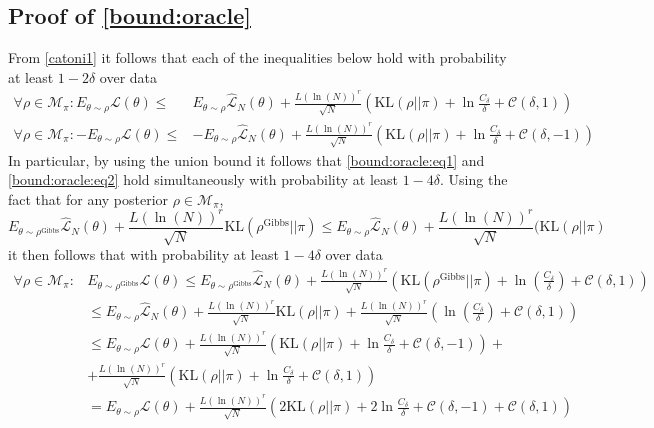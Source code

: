 \documentclass{article}
\newcommand{\KL}{\mathrm{KL}}
\renewcommand{\KL}{\mathrm{KL}}
\begin{document}
\subsection{Proof of \eqref{bound:oracle}}
  From \eqref{catoni1} it follows that  each of the inequalities below hold with probability at least $1-2\delta$
  over data
  \begin{align}
      \forall \rho \in \mathcal{M}_\pi: E_{\theta \sim \rho} \mathcal{L}(\theta) \leq & E_{\theta\sim \rho} \hat{\mathcal{L}}_N(\theta)+  \frac{L(\ln(N))^{r}}{\sqrt{N}}(\KL(\rho ||\pi)+\ln\frac{C_{\delta}}{\delta} +  \mathcal{C}(\delta,1))
      \label{bound:oracle:eq1} \\
      \forall \rho \in \mathcal{M}_\pi: -E_{\theta \sim \rho} \mathcal{L}(\theta) \leq & -E_{\theta\sim \rho} \hat{\mathcal{L}}_N(\theta)+  \frac{L(\ln(N))^{r}}{\sqrt{N}}(\KL(\rho ||\pi)+\ln\frac{C_{\delta}}{\delta} + 
  \mathcal{C}(\delta,-1))
   \label{bound:oracle:eq2} 
  \end{align}
  In particular, by using the union bound it follows that \eqref{bound:oracle:eq1} and \eqref{bound:oracle:eq2} hold simultaneously with probability at least $1-4\delta$.  Using the fact that 
  for any posterior $\rho \in \mathcal{M}_{\pi}$, 
  \[ 
    E_{\theta\sim \rho^{\text{Gibbs}}} \hat{\mathcal{L}}_N(\theta)+  \frac{L(\ln(N))^{r}}{\sqrt{N}}\KL(\rho^{\text{Gibbs}} ||\pi) \le 
     E_{\theta \sim \rho} \hat{\mathcal{L}}_N(\theta) + \frac{L(\ln(N))^{r}}{\sqrt{N}}(\KL(\rho ||\pi)
  \]
 it  
  then follows that with probability at least $1-4\delta$
  over data %
  \begin{align}
      \forall \rho \in \mathcal{M}_{\pi}: & E_{\theta \sim \rho^{\text{Gibbs}}} \mathcal{L}(\theta) \leq  E_{\theta\sim \rho^{\text{Gibbs}}} \hat{\mathcal{L}}_N(\theta)+  \frac{L(\ln(N))^{r}}{\sqrt{N}}(\KL(\rho^{\text{Gibbs}} ||\pi)+\ln\left(\frac{C_{\delta}}{\delta}\right) +  \mathcal{C}(\delta,1)) \nonumber \\
       & \le E_{\theta \sim \rho} \hat{\mathcal{L}}_N(\theta) + \frac{L(\ln(N))^{r}}{\sqrt{N}}\KL(\rho ||\pi)
       + \frac{L(\ln(N))^{r}}{\sqrt{N}}\left(\ln\left(\frac{C_{\delta}}{\delta}\right)+\mathcal{C}(\delta,1)\right) \nonumber \\
       & \le E_{\theta \sim \rho} \mathcal{L}(\theta) + \frac{L(\ln(N))^{r}}{\sqrt{N}}\left(\KL(\rho ||\pi)+\ln\frac{C_{\delta}}{\delta}+\mathcal{C}(\delta,-1)\right)+ \nonumber \\
       & + \frac{L(\ln(N))^{r}}{\sqrt{N}}\left(\KL(\rho ||\pi)+\ln\frac{C_{\delta}}{\delta}+\mathcal{C}(\delta,1)\right)
       \nonumber \\
       & =  E_{\theta \sim \rho} \mathcal{L}(\theta) + \frac{L(\ln(N))^{r}}{\sqrt{N}}\left(2\KL(\rho ||\pi)+2\ln\frac{C_{\delta}}{\delta}+\mathcal{C}(\delta,-1)+\mathcal{C}(\delta,1)\right)
      \label{bound:oracle:eq3}
  \end{align}
\end{document}
